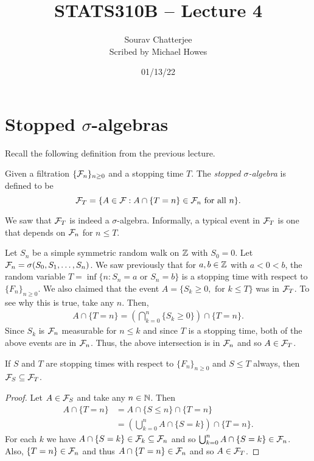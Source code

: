 




\title{STATS310B -- Lecture 4}
\author{Sourav Chatterjee\\ Scribed by Michael Howes}
\date{01/13/22}

\pagestyle{fancy}
\fancyhf{}


\maketitle
\tableofcontents
\section{Stopped $\sigma$-algebras}
Recall the following definition from the previous lecture.
\begin{definition}
    Given a filtration $\{{\mathcal{F}}_n\}_{n \ge 0}$ and a stopping time $T$. The \emph{stopped $\sigma$-algebra} is defined to be
    \[{\mathcal{F}}_T = \{A \in {\mathcal{F}} : A \cap \{T=n\} \in {\mathcal{F}}_n \text{ for all } n \}.\]
\end{definition}
We saw that ${\mathcal{F}}_T$ is indeed a $\sigma$-algebra. Informally, a typical event in ${\mathcal{F}}_T$ is one that depends on ${\mathcal{F}}_n$ for $n \le T$. 
\begin{example}
    Let $S_n$ be a simple symmetric random walk on ${{\mathbb Z}}$ with $S_0=0$. Let ${\mathcal{F}}_n = \sigma(S_0,S_1,\ldots, S_n)$. We saw previously that for $a,b \in {{\mathbb Z}}$ with $a < 0 < b$, the random variable $T = \inf\{n : S_n = a \text{ or } S_n = b\}$ is a stopping time with respect to $\{F_n\}_{n \ge 0}$. We also claimed that the event $A = \{S_k \ge 0, \text{ for } k\le T\}$ was in ${\mathcal{F}}_T$. To see why this is true, take any $n$. Then,
    \begin{align*}
        A \cap \{T=n\} = \left(\bigcap_{k=0}^n \{S_k \ge 0\} \right)\cap \{T=n\}.
    \end{align*}
    Since $S_k$ is ${\mathcal{F}}_n$ measurable for $n \le k$ and since $T$ is a stopping time, both of the above events are in ${\mathcal{F}}_n$. Thus, the above intersection is in ${\mathcal{F}}_n$ and so $A \in {\mathcal{F}}_T$. 
\end{example}
\begin{proposition}
    If $S$ and $T$ are stopping times with respect to $\{F_n\}_{n \ge 0}$ and $S \le T$ always, then ${\mathcal{F}}_S \subseteq {\mathcal{F}}_T$.
\end{proposition}
\begin{proof}
    Let $A \in {\mathcal{F}}_S$ and take any $n \in {{\mathbb N}}$. Then 
    \begin{align*}
        A \cap \{T = n\} &= A \cap \{S \le n \} \cap \{T =n\}\\
        &=\left(\bigcup_{k=0}^n A \cap \{S = k\}\right) \cap \{T=n\}.
    \end{align*}
    For each $k$ we have $A \cap \{S=k\} \in {\mathcal{F}}_k \subseteq {\mathcal{F}}_n$ and so $\bigcup_{k=0}^n A \cap \{S=k\} \in {\mathcal{F}}_n$. Also, $\{T=n\} \in {\mathcal{F}}_n$ and thus $A \cap \{T=n\} \in {\mathcal{F}}_n$ and so $A \in {\mathcal{F}}_T$.
\end{proof}
